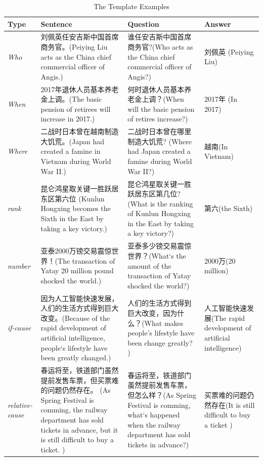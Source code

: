 \documentclass[runningheads,UTF8,article]{comsis2}
\begin{document}
	\begin{table}[!ht]
		\centering
		\caption{The Template Examples}
		\setlength\tabcolsep{0.5em}
		\label{example}
		\begin{tabular}{|p{40pt}|p{115pt} | p{110pt} |p{50pt}|}
			\hline
			Type& Sentence & Question & Answer \\
			\hline
			\emph{Who} & 刘佩英任安吉斯中国首席商务官。(Peiying Liu acts as the China chief commercial officer of Angis.) & 谁任安吉斯中国首席商务官?(Who acts as the China chief commercial officer of Angis?)& 刘佩英    (Peiying Liu)\\
			\hline
			\emph{When} & 2017年退休人员基本养老金上调。(The basic pension of retirees will increase in 2017.) & 何时退休人员基本养老金上调？(When will the basic pension of retires increase?) & 2017年 (In 2017) \\
			\hline
			\emph{Where} & 二战时日本曾在越南制造大饥荒。(Japan had created a famine in Vietnam during World War II.)& 二战时日本曾在哪里制造大饥荒?	(Where had Japan created a famine during World War II?) & 越南(In Vietnam)\\
			\hline
			\emph{rank}& 昆仑鸿星取关键一胜跃居东区第六位 (Kunlun Hongxing becomes the Sixth in the East by taking a key victory.)& 昆仑鸿星取关键一胜跃居东区第几位?(What is the ranking of Kunlun Hongxing in the East by taking a key victory?)& 第六(the Sixth)\\
			\hline
			\emph{number}& 亚泰2000万镑交易震惊世界！(The transaction of Yatay 20 million pound shocked the world.)& 亚泰多少镑交易震惊世界？(What`s the amount of the transaction of Yatay shocked the world?)& 2000万(20 million) \\
			\hline
			\emph{if-cause}& 因为人工智能快速发展，人们的生活方式得到巨大改变。(Because of the rapid development of artificial intelligence, people`s lifestyle have been greatly changed.)&	人们的生活方式得到巨大改变，因为什么？(What makes people's lifestyle have been change greatly? )&	人工智能快速发展(The rapid development of artificial intelligence)\\
			\hline
			\emph{relative-cause}& 春运将至，铁道部门虽然提前发售车票，但买票难的问题仍然存在。	(As Spring Festival is comming, the railway department has sold tickets in advance, but it is still difficult to buy a ticket. )&春运将至，铁道部门虽然提前发售车票，但怎么样？(As Spring Festival is comming, what`s happened when the railway department has sold tickets in advance?)&	买票难的问题仍然存在(It is still difficult to buy a ticket )\\
			
			\hline
		\end{tabular}
	\end{table}
	
\end{document}

